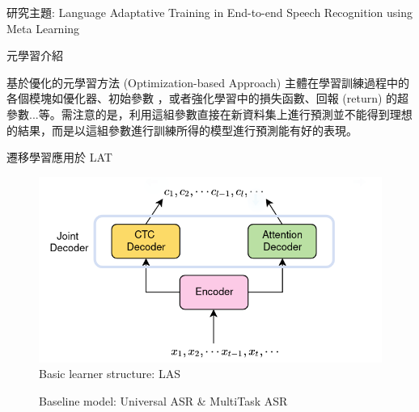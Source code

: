 \documentclass[12pt,UTF8,fntef]{article}
\begin{document}
\begin{section}{研究主題: Language Adaptative Training in End-to-end Speech Recognition using Meta Learning}
\begin{subsection}{元學習介紹}
    \begin{subsubsection}{基於優化的元學習方法 (Optimization-based Approach)} \label{opt-meta}
主體在學習訓練過程中的各個模塊如優化器\cite{ravi2016optimization}、初始參數\cite{nichol2018first, finn2017model,flennerhag2018transferring} ，或者強化學習中的損失函數、回報 (return) 的超參數...等。需注意的是，利用這組參數直接在新資料集上進行預測並不能得到理想的結果，而是以這組參數進行訓練所得的模型進行預測能有好的表現。
    \end{subsubsection}
  \end{subsection}
  \newpage

  \begin{subsection}{遷移學習應用於 LAT} \label{trans-asr}

  \begin{figure}[ht]
      \centering
      \includegraphics[width=0.6\linewidth]{monoASR.png}
      \caption{Basic learner structure: LAS}
      \label{fig:monoASR}
  \end{figure}

  \vspace{-0.25in}

  \begin{figure}[ht]
    \centering
    \caption{Baseline model: Universal ASR \& MultiTask ASR}
  \end{figure}


\end{subsection}
\end{section}
\end{document}
